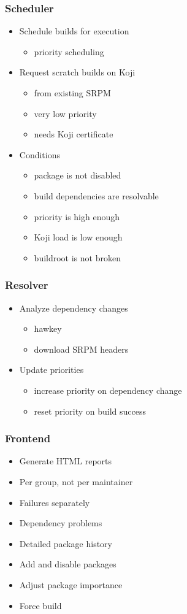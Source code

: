 \documentclass[pdftex,unicode,xcolor=table]{beamer}
\begin{document}
\begin{frame}
  \frametitle{Scheduler}
  \begin{itemize}
    \item Schedule builds for execution
    \begin{itemize}
      \item priority scheduling
    \end{itemize}
    \item Request scratch builds on Koji
    \begin{itemize}
      \item from existing SRPM
      \item very low priority
      \item needs Koji certificate
    \end{itemize}
    \item Conditions
    \begin{itemize}
      \item package is not disabled
      \item build dependencies are resolvable
      \item priority is high enough
      \item Koji load is low enough
      \item buildroot is not broken
    \end{itemize}
  \end{itemize}
\end{frame}

\begin{frame}
  \frametitle{Resolver}
  \begin{itemize}
    \item Analyze dependency changes
    \begin{itemize}
      \item hawkey
      \item download SRPM headers
    \end{itemize}
    \item Update priorities
    \begin{itemize}
      \item increase priority on dependency change
      \item reset priority on build success
    \end{itemize}
  \end{itemize}
\end{frame}

\begin{frame}
  \frametitle{Frontend}
  \begin{itemize}
    \item Generate HTML reports
    \item Per group, not per maintainer
    \item Failures separately
    \item Dependency problems
    \item Detailed package history
    \item Add and disable packages
    \item Adjust package importance
    \item Force build
  \end{itemize}
\end{frame}
\end{document}
